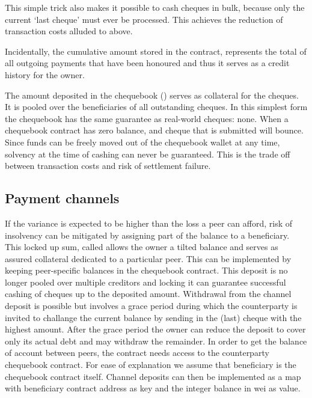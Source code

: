 This simple trick also makes it possible to cash cheques in bulk, because only the current `last cheque' must ever be processed. This achieves the reduction of transaction costs alluded to above.

Incidentally, the cumulative amount stored in the contract, represents the total of all outgoing payments that have been honoured and thus it serves as a credit history for the owner.

The amount deposited in the chequebook () serves as collateral for the cheques. It is pooled over the beneficiaries of all outstanding cheques.
In this simplest form the chequebook has the same guarantee as real-world cheques: none. When a chequebook contract has zero balance, and cheque that is submitted will bounce. Since funds can be freely moved out of the chequebook wallet at any time, solvency at the time of cashing can never be guaranteed. This is the trade off between transaction costs and risk of settlement failure.







\subsection{Payment channels}

If the variance is expected to be higher than the loss a peer can afford,
risk of insolvency can be mitigated by assigning part of the balance to a beneficiary.
This locked up sum, called  allows the owner a tilted balance and
serves as assured collateral dedicated to a particular peer.
This can be implemented by keeping peer-specific balances in the chequebook contract.
This deposit is no longer pooled over multiple creditors
and locking it can guarantee successful cashing of cheques up to the deposited amount.
Withdrawal from the channel deposit is possible but involves a grace period during which
the counterparty is invited to challange the current balance by sending in the (last) cheque
with the highest amount. After the grace period the owner can reduce the deposit to cover only
its actual debt and may withdraw the remainder.
In order to get the balance of account between peers, the contract needs access to the counterparty
chequebook contract. For ease of explanation we assume that beneficiary is the
chequebook contract itself. Channel deposits can then be implemented as a map with beneficiary contract
address as key and the integer balance in wei as value.

